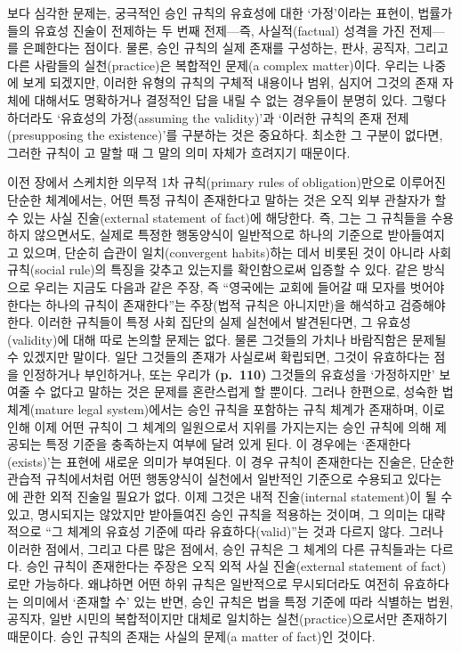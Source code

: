 보다 심각한 문제는, 궁극적인 승인 규칙의 유효성에 대한 `가정'이라는
표현이, 법률가들의 유효성 진술이 전제하는 두 번째 전제---즉,
사실적(factual) 성격을 가진 전제---를 은폐한다는 점이다. 물론, 승인
규칙의 실제 존재를 구성하는, 판사, 공직자, 그리고 다른 사람들의
실천(practice)은 복합적인 문제(a complex matter)이다. 우리는 나중에 보게
되겠지만, 이러한 유형의 규칙의 구체적 내용이나 범위, 심지어 그것의 존재
자체에 대해서도 명확하거나 결정적인 답을 내릴 수 없는 경우들이 분명히
있다. 그렇다 하더라도 `유효성의 가정(assuming the validity)'과 `이러한
규칙의 존재 전제(presupposing the existence)'를 구분하는 것은 중요하다.
최소한 그 구분이 없다면, 그러한 규칙이 고 말할 때
그 말의 의미 자체가 흐려지기 때문이다.

이전 장에서 스케치한 의무적 1차 규칙(primary rules of obligation)만으로
이루어진 단순한 체계에서는, 어떤 특정 규칙이 존재한다고 말하는 것은 오직
외부 관찰자가 할 수 있는 사실 진술(external statement of fact)에
해당한다. 즉, 그는 그 규칙들을 수용하지 않으면서도, 실제로 특정한
행동양식이 일반적으로 하나의 기준으로 받아들여지고 있으며, 단순히 습관이
일치(convergent habits)하는 데서 비롯된 것이 아니라 사회 규칙(social
rule)의 특징을 갖추고 있는지를 확인함으로써 입증할 수 있다. 같은
방식으로 우리는 지금도 다음과 같은 주장, 즉 ``영국에는 교회에 들어갈 때
모자를 벗어야 한다는 하나의 규칙이 존재한다''는 주장(법적 규칙은
아니지만)을 해석하고 검증해야 한다. 이러한 규칙들이 특정 사회 집단의
실제 실천에서 발견된다면, 그 유효성(validity)에 대해 따로 논의할 문제는
없다. 물론 그것들의 가치나 바람직함은 문제될 수 있겠지만 말이다. 일단
그것들의 존재가 사실로써 확립되면, 그것이 유효하다는 점을 인정하거나
부인하거나, 또는 우리가 \textbf{(p.~110)} 그것들의 유효성을 `가정하지만'
보여줄 수 없다고 말하는 것은 문제를 혼란스럽게 할 뿐이다. 그러나
한편으로, 성숙한 법체계(mature legal system)에서는 승인 규칙을 포함하는
규칙 체계가 존재하며, 이로 인해 이제 어떤 규칙이 그 체계의 일원으로서
지위를 가지는지는 승인 규칙에 의해 제공되는 특정 기준을 충족하는지
여부에 달려 있게 된다. 이 경우에는 `존재한다(exists)'는 표현에 새로운
의미가 부여된다. 이 경우 규칙이 존재한다는 진술은, 단순한 관습적
규칙에서처럼 어떤 행동양식이 실천에서 일반적인 기준으로 수용되고 있다는
에 관한 외적 진술일 필요가 없다. 이제 그것은 내적
진술(internal statement)이 될 수 있고, 명시되지는 않았지만 받아들여진
승인 규칙을 적용하는 것이며, 그 의미는 대략적으로 ``그 체계의 유효성
기준에 따라 유효하다(valid)''는 것과 다르지 않다. 그러나 이러한 점에서,
그리고 다른 많은 점에서, 승인 규칙은 그 체계의 다른 규칙들과는 다르다.
승인 규칙이 존재한다는 주장은 오직 외적 사실 진술(external statement of
fact)로만 가능하다. 왜냐하면 어떤 하위 규칙은 일반적으로 무시되더라도
여전히 유효하다는 의미에서 `존재할 수' 있는 반면, 승인 규칙은 법을 특정
기준에 따라 식별하는 법원, 공직자, 일반 시민의 복합적이지만 대체로
일치하는 실천(practice)으로서만 존재하기 때문이다. 승인 규칙의 존재는
사실의 문제(a matter of fact)인 것이다.

